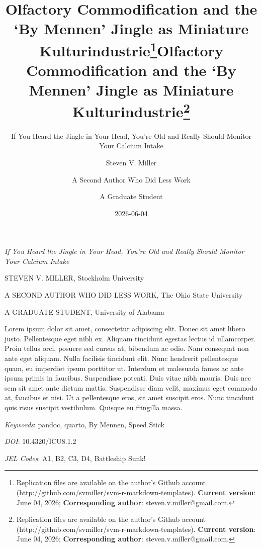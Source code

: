 \documentclass[
  12pt,
]{article}
\title{Olfactory Commodification and the `By Mennen' Jingle as Miniature
Kulturindustrie\thanks{Replication files are available on the author's
Github account (http://github.com/svmiller/svm-r-markdown-templates).
\textbf{Current version}: June 04, 2026; \textbf{Corresponding author}:
steven.v.miller@gmail.com.}}
\subtitle{If You Heard the Jingle in Your Head, You're Old and Really
Should Monitor Your Calcium Intake}
\author{Steven V. Miller \and A Second Author Who Did Less Work \and A
Graduate Student}
\date{2026-06-04}
\title{Olfactory Commodification and the `By Mennen' Jingle as Miniature
Kulturindustrie\thanks{Replication files are available on the author's
Github account (http://github.com/svmiller/svm-r-markdown-templates).
\textbf{Current version}: June 04, 2026; \textbf{Corresponding author}:
steven.v.miller@gmail.com.}  }
\date{}
\renewenvironment{abstract}
 {{%
    \setlength{\leftmargin}{0mm}
    \setlength{\rightmargin}{\leftmargin}%
  }%
  \relax}
 {\endlist}
\begin{document}



{%
\setlength{\parindent}{0pt}
\thispagestyle{plain}
{%
\maketitle  %
}

\emph{If You Heard the Jingle in Your Head, You're Old and Really Should
Monitor Your Calcium Intake}

{
   \vskip 13.5pt\relax \normalsize\fontsize{11}{12}
   
\MakeUppercase{\textsf{\large Steven V. Miller}}, 
\small{
Stockholm University
}   \par 
\MakeUppercase{\textsf{\large A Second Author Who Did Less Work}}, 
\small{
The Ohio State University
}   \par 
\MakeUppercase{\textsf{\large A Graduate Student}}, 
\small{
University of Alabama
}   

}

}








\begin{abstract}


    \vskip 8.5pt %

\noindent \small{Lorem ipsum dolor sit amet, consectetur adipiscing
elit. Donec sit amet libero justo. Pellentesque eget nibh ex. Aliquam
tincidunt egestas lectus id ullamcorper. Proin tellus orci, posuere sed
cursus at, bibendum ac odio. Nam consequat non ante eget aliquam. Nulla
facilisis tincidunt elit. Nunc hendrerit pellentesque quam, eu imperdiet
ipsum porttitor ut. Interdum et malesuada fames ac ante ipsum primis in
faucibus. Suspendisse potenti. Duis vitae nibh mauris. Duis nec sem sit
amet ante dictum mattis. Suspendisse diam velit, maximus eget commodo
at, faucibus et nisi. Ut a pellentesque eros, sit amet suscipit eros.
Nunc tincidunt quis risus suscipit vestibulum. Quisque eu fringilla
massa.}

\vskip 8.5pt \noindent \emph{Keywords}: pandoc, quarto, By Mennen, Speed
Stick \par

\emph{DOI}: 10.4320/ICU8.1.2\vspace{1pt}\par
\emph{JEL Codes}: A1, B2, C3, D4, Battleship Sunk!

\end{abstract}
\end{document}
